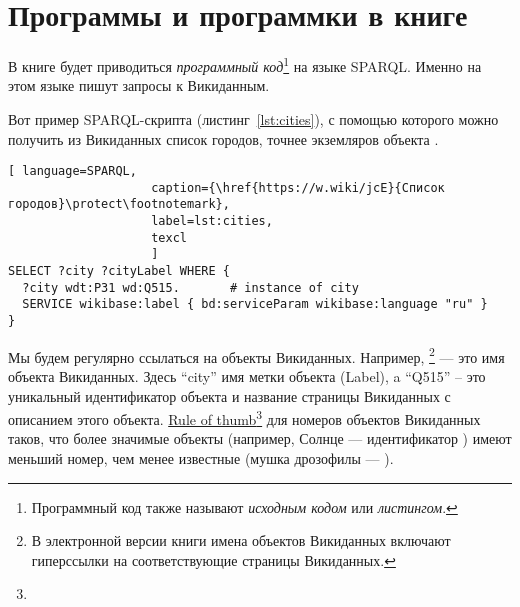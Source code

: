 \chapter{Программы и программки в книге}
\label{ch:listing_about}

В книге будет приводиться \emph{программный код}\footnote[][0cm]{
    Программный код также называют  \emph{исходным кодом} или 
    \emph{листингом}.
%   
} на языке SPARQL. 
Именно на этом языке пишут запросы к Викиданным.


Вот пример SPARQL-скрипта (листинг~\ref{lst:cities}), 
с помощью которого можно получить из Викиданных список городов, 
точнее экземляров объекта  
.

\begin{lstlisting}[ language=SPARQL, 
                    caption={\href{https://w.wiki/jcE}{Список городов}\protect\footnotemark},
                    label=lst:cities,
                    texcl 
                    ]
SELECT ?city ?cityLabel WHERE { 
  ?city wdt:P31 wd:Q515.       # instance of city
  SERVICE wikibase:label { bd:serviceParam wikibase:language "ru" }
}
\end{lstlisting}%


Мы будем регулярно ссылаться на объекты Викиданных. 
Например, \footnote[][0cm]{%
%    
    В электронной версии книги имена объектов Викиданных включают гиперссылки на соответствующие страницы Викиданных.
} 
--- это имя объекта Викиданных. 
Здесь ``city'' имя метки объекта (Label), 
a ``Q515'' -- это уникальный идентификатор объекта 
и название страницы Викиданных с описанием этого объекта.
\href{https://en.wikipedia.org/wiki/Rule_of_thumb}{Rule of thumb}\footnote[][0cm]{%
%
} 
для номеров объектов Викиданных таков, что более значимые объекты 
(например, Солнце --- идентификатор ) 
имеют меньший номер, чем менее известные
(мушка дрозофилы --- ).
